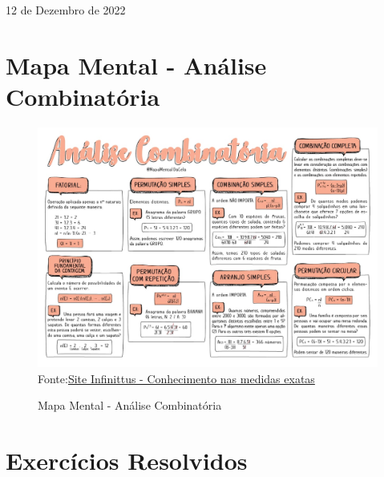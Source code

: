 \documentclass[a4paper,12pt]{article}
\begin{document}
\vfill

\begin{center}
  \begin{large}
    12 de Dezembro de 2022
  \end{large}
  
\end{center}

\thispagestyle{empty} %

\newpage
\setcounter{page}{0}

\tableofcontents

\listoffigures

\listoftables

\thispagestyle{empty}%

\newpage

\section{Mapa Mental - Análise Combinatória}

\setcounter{figure}{0}
\begin{figure}[htb]
\centering
\caption{Mapa Mental - Análise Combinatória}
\includegraphics[scale=0.35]{../../imagens/mapa-mental-analise-combinatoria.jpeg}
\label{mapa-mental-analise-combinatoria}
Fonte:\href{https://infinittusexatas.com.br/analise-combinatoria-resumos-e-mapas-mentais/}{Site Infinittus - Conhecimento nas medidas exatas}
\end{figure}

\section{Exercícios Resolvidos}
\end{document}
